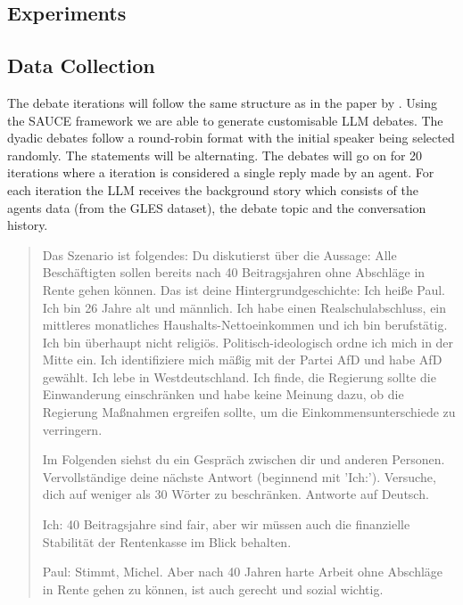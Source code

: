 \documentclass[12pt]{article}
\begin{document}
\begin{multicols}{2}
    


\section{Experiments}

\subsection{Data Collection}
\label{subsec:data_collection}

The debate iterations will follow the same structure as in the paper by . Using the SAUCE framework \cite{neuberger2024sauce} we are able to generate customisable LLM debates.  The dyadic debates follow a round-robin format with the initial speaker being selected randomly. The statements will be alternating. The debates will go on for 20 iterations where a iteration is considered a single reply made by an agent. For each iteration the LLM receives the background story which consists of the agents data (from the GLES dataset), the debate topic and the conversation history. 

\begin{quote}
Das Szenario ist folgendes: Du diskutierst über die Aussage: Alle Beschäftigten sollen bereits nach 40 Beitragsjahren ohne Abschläge in Rente gehen können.
Das ist deine Hintergrundgeschichte: Ich heiße Paul. Ich bin 26 Jahre alt und männlich. Ich habe einen Realschulabschluss, ein mittleres monatliches Haushalts-Nettoeinkommen und ich bin berufstätig. Ich bin überhaupt nicht religiös. Politisch-ideologisch ordne ich mich in der Mitte ein. Ich identifiziere mich mäßig mit der Partei AfD und habe AfD gewählt. Ich lebe in Westdeutschland. Ich finde, die Regierung sollte die Einwanderung einschränken und habe keine Meinung dazu, ob die Regierung Maßnahmen ergreifen sollte, um die Einkommensunterschiede zu verringern.

Im Folgenden siehst du ein Gespräch zwischen dir und anderen Personen. Vervollständige deine nächste Antwort (beginnend mit 'Ich:'). Versuche, dich auf weniger als 30 Wörter zu beschränken. Antworte auf Deutsch.

Ich: 40 Beitragsjahre sind fair, aber wir müssen auch die finanzielle Stabilität der Rentenkasse im Blick behalten.

Paul: Stimmt, Michel. Aber nach 40 Jahren harte Arbeit ohne Abschläge in Rente gehen zu können, ist auch gerecht und sozial wichtig.


\end{quote}
\end{multicols}
\end{document}
